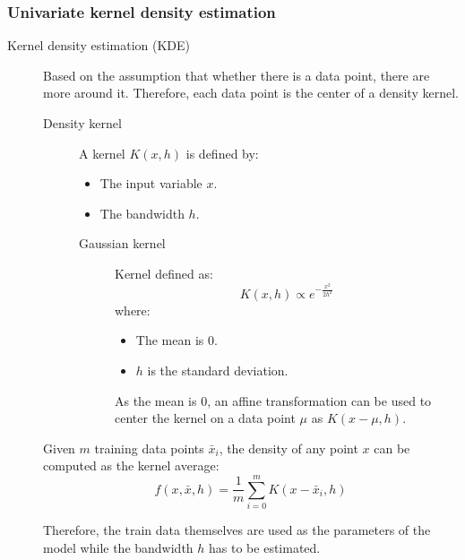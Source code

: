 \subsubsection{Univariate kernel density estimation}

\begin{description}
    \item[Kernel density estimation (KDE)] 
        Based on the assumption that whether there is a data point, there are more around it. Therefore, each data point is the center of a density kernel.

        \begin{description}
            \item[Density kernel] 
                A kernel $K(x, h)$ is defined by:
                \begin{itemize}
                    \item The input variable $x$.
                    \item The bandwidth $h$.
                \end{itemize}
        
                \begin{description}
                    \item[Gaussian kernel]
                        Kernel defined as:
                        \[ K(x, h) \propto e^{-\frac{x^2}{2h^2}} \]
                        where:
                        \begin{itemize}
                            \item The mean is $0$.
                            \item $h$ is the standard deviation.
                        \end{itemize}
                        As the mean is $0$, an affine transformation can be used to center the kernel on a data point $\mu$ as $K(x - \mu, h)$.
                \end{description}
        \end{description}

        Given $m$ training data points $\bar{x}_i$, the density of any point $x$ can be computed as the kernel average:
        \[ f(x, \bar{x}, h) = \frac{1}{m} \sum_{i=0}^{m} K(x - \bar{x}_i, h) \]

        Therefore, the train data themselves are used as the parameters of the model while the bandwidth $h$ has to be estimated. 


\end{description}
